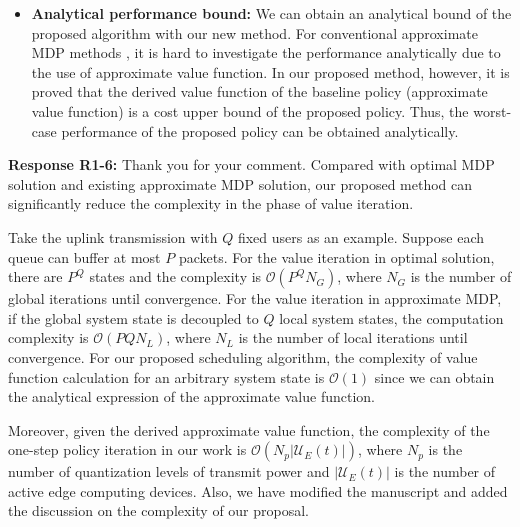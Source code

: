 \documentclass[12pt,onecolumn]{IEEEtran}
\newcommand{\blue}{\color{blue}}
\newcommand{\spaceblank}{\vskip 4mm}
\begin{document}
{\begin{itemize}
\item \textbf{Analytical performance bound:} We can obtain an analytical bound of the proposed algorithm with our new method. For conventional approximate MDP methods \cite{YCui2010AMDP-OFDM-downlink,YCui2010AMDP-OFDM-uplink,RWang2011DistTowHopMIMO,RWang2011QueueAwareCoorp, RWang2013RelayApproxMDP,YSun2019PushingCaching,BLv2019Cache}, it is hard to investigate the performance analytically due to the use of approximate value function. In our proposed method, however, it is proved that the derived value function of the baseline policy (approximate value function) is a cost upper bound of the proposed policy. Thus, the worst-case performance of the proposed policy can be obtained analytically. 
\end{itemize}
}


\spaceblank
{}
\spaceblank
{\blue \textbf{Response R1-6:} Thank you for your comment. 
Compared with optimal MDP solution and existing approximate MDP solution, our proposed method can significantly reduce the complexity in the phase of value iteration. 

Take the uplink transmission with $Q$ fixed users as an example. Suppose each queue can buffer at most $P$ packets. For the value iteration in optimal solution, there are $P^Q$ states and the complexity is $\mathcal O(P^QN_G)$, where $N_G$ is the number of global iterations until convergence. For the value iteration in approximate MDP, if the global system state is decoupled to $Q$ local system states, the computation complexity is $\mathcal O(PQN_L)$, where $N_L$ is the number of local iterations until convergence. For our proposed scheduling algorithm, the complexity of value function calculation for an arbitrary system state is $\mathcal O(1)$ since we can obtain the analytical expression of the approximate value function.

Moreover, given the derived approximate value function, the complexity of the one-step policy iteration in our work is $\mathcal O(N_p|\mathcal U_E(t)|)$, where $N_p$ is the number of quantization levels of transmit power and $|\mathcal U_E(t)|$ is the number of active edge computing devices. Also, we have modified the manuscript and added the discussion on the complexity of our proposal.

}
\end{document}
